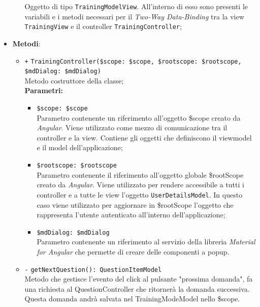 \begin{itemize}
\begin{itemize}
		Oggetto di tipo \texttt{TrainingModelView}. All'interno di esso sono presenti le variabili e i metodi necessari per il \textit{Two-Way Data-Binding} tra la view \texttt{TrainingView} e il controller \texttt{TrainingController};
	\end{itemize}
	\item \textbf{Metodi}:
	\begin{itemize}
		\item \texttt{+} \texttt{TrainingController(\$scope: \$scope, \$rootscope: \$rootscope, \$mdDialog: \$mdDialog)} \\ Metodo costruttore della classe; \\
		\textbf{Parametri:}
		\begin{itemize}
			\item \texttt{\$scope: \$scope} \\
			Parametro contenente un riferimento all’oggetto \$scope creato da \textit{Angular}. Viene utilizzato come mezzo di comunicazione tra il controller e la view. Contiene gli oggetti che definiscono il viewmodel e il model dell’applicazione;
			\item \texttt{\$rootscope: \$rootscope}\\
			Parametro contenente il riferimento all'oggetto globale \$rootScope creato da \textit{Angular}. Viene utilizzato per rendere accessibile a tutti i controller e a tutte le view l'oggetto \texttt{UserDetailsModel}. In questo caso viene utilizzato per aggiornare in \$rootScope l'oggetto che rappresenta l'utente autenticato all'interno dell'applicazione;
			\item \texttt{\$mdDialog: \$mdDialog} \\
			Parametro contenente un riferimento al servizio della libreria \textit{Material for Angular} che permette di creare delle componenti a popup.
		\end{itemize}
		\item \texttt{-} \texttt{getNextQuestion(): QuestionItemModel} \\ Metodo che gestisce l'evento del click al pulsante "prossima domanda", fa una richiesta al QuestionController che ritornerà la domanda successiva. Questa domanda andrà salvata nel TrainingModeModel nello \$scope.
	\end{itemize}
\end{itemize}

